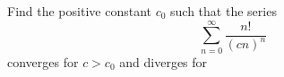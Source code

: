Find the positive constant $c_0$ such that the series \[ \displaystyle\sum_{n = 0}^{\infty} \dfrac {n!}{(cn)^n} \] converges for $c>c_0$ and diverges for 